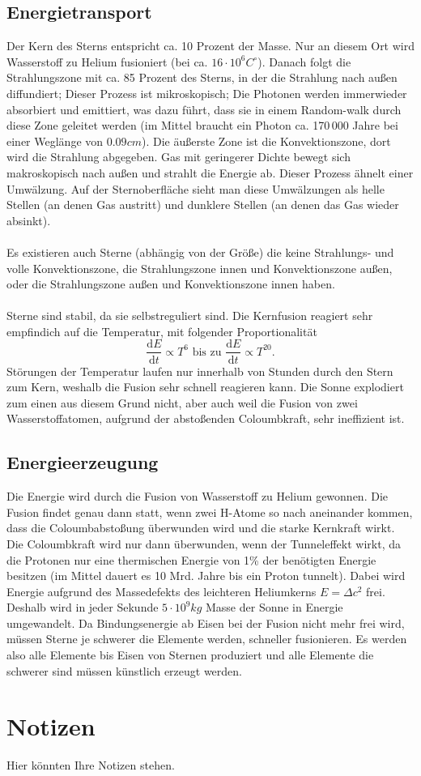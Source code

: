\documentclass[a4paper,12pt]{article}
\begin{document}
\subsection{Energietransport}
Der Kern des Sterns entspricht ca. 10 Prozent der Masse. Nur an diesem Ort wird Wasserstoff zu Helium fusioniert (bei ca. $16\cdot 10^6C^\circ$). Danach folgt die Strahlungszone mit ca. 85 Prozent des Sterns, in der die Strahlung nach außen diffundiert; Dieser Prozess ist mikroskopisch; Die Photonen werden immerwieder absorbiert und emittiert, was dazu führt, dass sie in einem \glqq Random-walk\grqq{} durch diese Zone geleitet werden (im Mittel braucht ein Photon ca. 170\,000 Jahre bei einer Weglänge von $0.09cm$). Die äußerste Zone ist die Konvektionszone, dort wird die Strahlung abgegeben. Gas mit geringerer Dichte bewegt sich makroskopisch nach außen und strahlt die Energie ab. Dieser Prozess ähnelt einer Umwälzung. Auf der Sternoberfläche sieht man diese Umwälzungen als helle Stellen (an denen Gas austritt) und dunklere Stellen (an denen das Gas wieder absinkt).\\\\
Es existieren auch Sterne (abhängig von der Größe) die keine Strahlungs- und volle Konvektionszone, die Strahlungszone innen und Konvektionszone außen, oder die Strahlungszone außen und Konvektionszone innen haben.\\\\
Sterne sind stabil, da sie selbstreguliert sind. Die Kernfusion reagiert sehr empfindich auf die Temperatur, mit folgender Proportionalität
\[ 
        \dfrac{\text{d}E}{\text{d}t}\propto T^6\text{ bis zu }\dfrac{\text{d}E}{\text{d}t}\propto T^{20}
.\] 
\glqq Störungen\grqq{} der Temperatur laufen nur innerhalb von Stunden durch den Stern zum Kern, weshalb die Fusion sehr schnell reagieren kann. Die Sonne explodiert zum einen aus diesem Grund nicht, aber auch weil die Fusion von zwei Wasserstoffatomen, aufgrund der abstoßenden Coloumbkraft, sehr ineffizient ist.

\subsection{Energieerzeugung}
Die Energie wird durch die Fusion von Wasserstoff zu Helium gewonnen. Die Fusion findet genau dann statt, wenn zwei H-Atome so nach aneinander kommen, dass die Coloumbabstoßung überwunden wird und die starke Kernkraft wirkt. Die Coloumbkraft wird nur dann überwunden, wenn der Tunneleffekt wirkt, da die Protonen nur eine thermischen Energie von 1\% der benötigten Energie besitzen (im Mittel dauert es 10 Mrd. Jahre bis ein Proton tunnelt). Dabei wird Energie aufgrund des Massedefekts des leichteren Heliumkerns $E=\Delta c ^2$ frei. Deshalb wird in jeder Sekunde $5\cdot 10^{9}kg$ Masse der Sonne in Energie umgewandelt. Da Bindungsenergie ab Eisen bei der Fusion nicht mehr frei wird, müssen Sterne je schwerer die Elemente werden, schneller fusionieren. Es werden also alle Elemente bis Eisen von Sternen produziert und alle Elemente die schwerer sind müssen künstlich erzeugt werden.


\section{Notizen}
Hier könnten Ihre Notizen stehen.


\newpage
\end{document}
